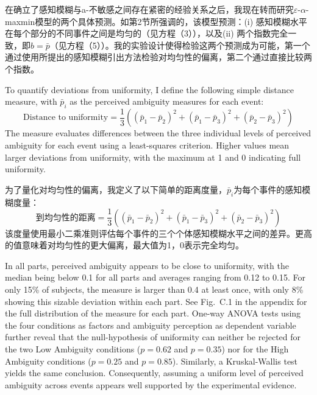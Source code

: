 \documentclass[12pt,a4paper]{article}
\newenvironment{original}
  {\par\medskip\noindent\color{black}\ignorespaces}
  {\par\medskip}
\newenvironment{translation}
  {\par\noindent\color{transblue}\ignorespaces}
  {\par\medskip\medskip}
\begin{document}
\begin{translation}
在确立了感知模糊与a-不敏感之间存在紧密的经验关系之后，我现在转而研究$\varepsilon$-$\alpha$-maxmin模型的两个具体预测。如第2节所强调的，该模型预测：(i) 感知模糊水平在每个部分的不同事件之间是均匀的（见方程（3）），以及(ii) 两个指数完全一致，即$b = \bar{p}$（见方程（5））。我的实验设计使得检验这两个预测成为可能，第一个通过使用所提出的感知模糊引出方法检验对均匀性的偏离，第二个通过直接比较两个指数。
\end{translation}

\begin{original}
To quantify deviations from uniformity, I define the following simple distance measure, with $\bar{p}_i$ as the perceived ambiguity measures for each event:
\begin{equation}
\text{Distance to uniformity} = \frac{1}{3}\left((\bar{p}_1 - \bar{p}_2)^2 + (\bar{p}_1 - \bar{p}_3)^2 + (\bar{p}_2 - \bar{p}_3)^2\right)
\end{equation}
The measure evaluates differences between the three individual levels of perceived ambiguity for each event using a least-squares criterion. Higher values mean larger deviations from uniformity, with the maximum at 1 and 0 indicating full uniformity.
\end{original}

\begin{translation}
为了量化对均匀性的偏离，我定义了以下简单的距离度量，$\bar{p}_i$为每个事件的感知模糊度量：
\begin{equation}
\text{到均匀性的距离} = \frac{1}{3}\left((\bar{p}_1 - \bar{p}_2)^2 + (\bar{p}_1 - \bar{p}_3)^2 + (\bar{p}_2 - \bar{p}_3)^2\right)
\end{equation}
该度量使用最小二乘准则评估每个事件的三个个体感知模糊水平之间的差异。更高的值意味着对均匀性的更大偏离，最大值为1，0表示完全均匀。
\end{translation}

\begin{original}
In all parts, perceived ambiguity appears to be close to uniformity, with the median being below 0.1 for all parts and averages ranging from 0.12 to 0.15. For only 15\% of subjects, the measure is larger than 0.4 at least once, with only 8\% showing this sizable deviation within each part. See Fig.\ C.1 in the appendix for the full distribution of the measure for each part. One-way ANOVA tests using the four conditions as factors and ambiguity perception as dependent variable further reveal that the null-hypothesis of uniformity can neither be rejected for the two Low Ambiguity conditions ($p = 0.62$ and $p = 0.35$) nor for the High Ambiguity conditions ($p = 0.25$ and $p = 0.85$). Similarly, a Kruskal-Wallis test yields the same conclusion. Consequently, assuming a uniform level of perceived ambiguity across events appears well supported by the experimental evidence.
\end{original}
\end{document}
